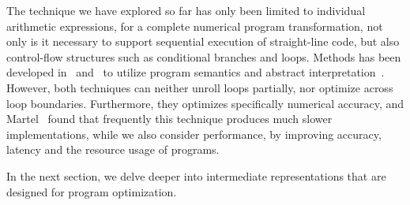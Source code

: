 The technique we have explored so far has only been limited to individual
arithmetic expressions, for a complete numerical program transformation, not
only is it necessary to support sequential execution of straight-line code,
but also control-flow structures such as conditional branches and loops.
Methods has been developed in~\cite{martel09} and~\cite{damouche15} to utilize
program semantics and abstract interpretation~\cite{cousot77}.  However,
both techniques can neither unroll loops partially, nor optimize across loop
boundaries.  Furthermore, they optimizes specifically numerical accuracy, and
Martel~\cite{martel09} found that frequently this technique produces much
slower implementations, while we also consider performance, by improving
accuracy, latency and the resource usage of programs.

In the next section, we delve deeper into intermediate representations that are
designed for program optimization.
